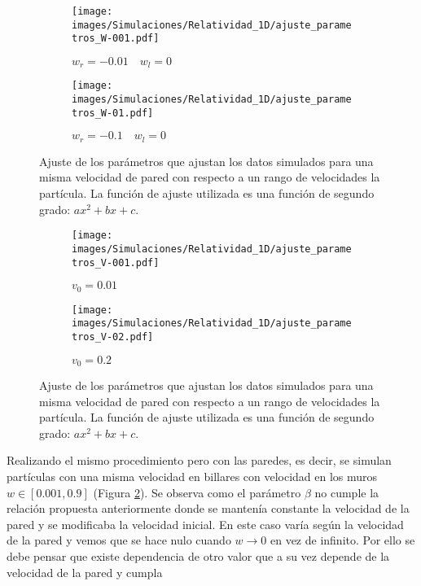 \documentclass[11pt, spanish]{book}
\newcommand{\cambios}[1]{\textcolor{green!70!black}{#1}}
\begin{document}
\vspace{3mm}

\begin{figure}[H]
    \begin{subfigure}[b]{0.5\textwidth}
        \centering
        \texttt{[image: images/Simulaciones/Relatividad\_1D/ajuste\_parametros\_W-001.pdf]}
        \caption{$w_r = -0.01 \quad w_l = 0$}
    \end{subfigure}
    \hfill
    \begin{subfigure}[b]{0.5\textwidth}
        \centering
        \texttt{[image: images/Simulaciones/Relatividad\_1D/ajuste\_parametros\_W-01.pdf]}
        \caption{$w_r = -0.1 \quad w_l = 0$}
    \end{subfigure}
    \caption{Ajuste de los parámetros que ajustan los datos simulados para una misma velocidad de pared con respecto a un rango de velocidades la partícula. La función de ajuste utilizada es una función de segundo grado: \( ax^2 + bx + c \).}
    \label{fig:ajuste_parametros_1D_relativity}
\end{figure}

\begin{figure}[h]
    \begin{subfigure}[b]{0.5\textwidth}
        \centering
        \texttt{[image: images/Simulaciones/Relatividad\_1D/ajuste\_parametros\_V-001.pdf]}
        \caption{$v_0 = 0.01$}
    \end{subfigure}
    \hfill
    \begin{subfigure}[b]{0.5\textwidth}
        \centering
        \texttt{[image: images/Simulaciones/Relatividad\_1D/ajuste\_parametros\_V-02.pdf]}
        \caption{$v_0 = 0.2$}
    \end{subfigure}
    \caption{Ajuste de los parámetros que ajustan los datos simulados para una misma velocidad de pared con respecto a un rango de velocidades la partícula. La función de ajuste utilizada es una función de segundo grado: \( ax^2 + bx + c \).}
    \label{fig:ajuste_parametros_1D_relativity_Vcte}
\end{figure}

Realizando el mismo procedimiento pero con las paredes, es decir, se simulan partículas con una misma velocidad en billares con velocidad en los muros \( w \in [0.001, 0.9] \) (Figura \ref{fig:ajuste_parametros_1D_relativity_Vcte}). \cambios{Se observa como el parámetro \( \beta \) no cumple la relación propuesta anteriormente donde se mantenía constante la velocidad de la pared y se modificaba la velocidad inicial. En este caso varía según la velocidad de la pared y vemos que se hace nulo cuando \( w \rightarrow 0 \) en vez de infinito. Por ello se debe pensar que existe dependencia de otro valor que a su vez depende de la velocidad de la pared y cumpla}
\end{document}
